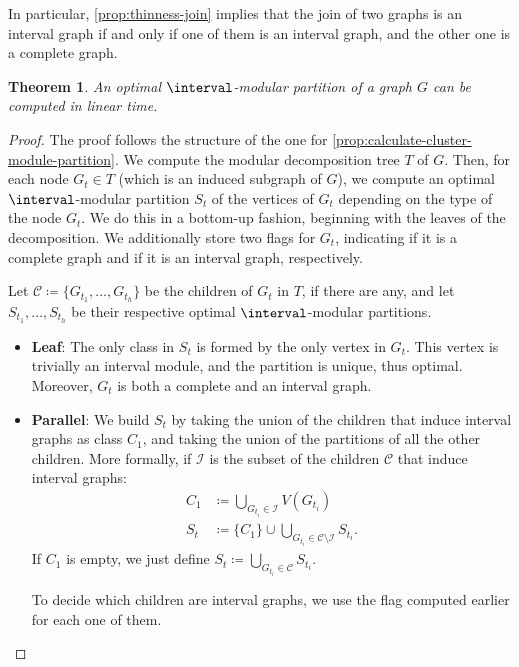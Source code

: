 \documentclass[11pt]{article}
\theoremstyle{plain}
\newtheorem{theorem}{Theorem}
\theoremstyle{definition}
\theoremstyle{remark}
\begin{document}
In particular, \cref{prop:thinness-join} implies that the join of two graphs is an interval graph if and only if one of them is an interval graph, and the other one is a complete graph.
\begin{theorem}
    \label{prop:calculate-interval-module-partition}
    An optimal $\interval$-modular partition of a graph $G$ can be computed in linear time.
\end{theorem}
\begin{proof}
\newcommand{\Stail}{\mathsf{tail}}
    The proof follows the structure of the one for \cref{prop:calculate-cluster-module-partition}. We compute the modular decomposition tree $T$ of $G$. Then, for each node $G_t \in T$ (which is an induced subgraph of $G$), we compute an optimal $\interval$-modular partition $S_t$ of the vertices of $G_t$ depending on the type of the node $G_t$. We do this in a bottom-up fashion, beginning with the leaves of the decomposition. We additionally store two flags for $G_t$, indicating if it is a complete graph and if it is an interval graph, respectively.
    
    Let $\mathcal{C} \coloneqq \{G_{t_1}, \dots, G_{t_h}\}$ be the children of $G_t$ in $T$, if there are any, and let $S_{t_1},\dots, S_{t_h}$ be their respective optimal $\interval$-modular partitions.
    \begin{itemize}
        \item \textbf{Leaf}: The only class in $S_t$ is formed by the only vertex in $G_t$. This vertex is trivially an interval module, and the partition is unique, thus optimal. Moreover, $G_t$ is both a complete and an interval graph.
        \item \textbf{Parallel}: We build $S_t$ by taking the union of the children that induce interval graphs as class $C_1$, and taking the union of the partitions of all the other children. More formally, if $\mathcal{I}$ is the subset of the children $\mathcal{C}$ that induce interval graphs: 
        \begin{align*}
            C_1 &\coloneqq \bigcup_{G_{t_i} \in \mathcal{I}}V(G_{t_i})\\
            S_t &\coloneqq \{C_1\} \cup \bigcup_{G_{t_i} \in \mathcal{C}\setminus\mathcal{I}}S_{t_i}.
        \end{align*}
        If $C_1$ is empty, we just define $S_t \coloneqq \bigcup_{G_{t_i} \in \mathcal{C}}S_{t_i}$.

        To decide which children are interval graphs, we use the flag computed earlier for each one of them.


\end{itemize}
\end{proof}
\end{document}
